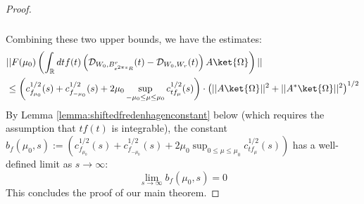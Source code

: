 \documentclass[a4paper,11pt]{article}
\theoremstyle{definition}
\newcommand{\lb}{\left(}
\newcommand{\rb}{\right)}
\begin{document}
\begin{proof}
\begin{align}
\begin{split}
        \end{split}
    \end{align}
    Combining these two upper bounds, we have the estimates:
    \begin{align}
        \begin{split}
            &||F(\mu_0)\lb\int_\mathbb{R} dt f(t)\lb\mathcal{D}_{W_0, B^r_{e^{2\pi s}R}}(t) - \mathcal{D}_{W_0, W_r}(t)\rb A\ket{\Omega}\rb||
            \\&
            \leq \lb c^{1/2}_{f_{\mu_0}}(s) + c^{1/2}_{f_{-\mu_0}}(s) + 2\mu_0\sup_{-\mu_0\leq \mu\leq \mu_0}c^{1/2}_{tf_\mu}(s) \rb\cdot\lb||A\ket{\Omega}||^2 + ||A^*\ket{\Omega}||^2\rb^{1/2}
        \end{split}
    \end{align}
    By Lemma \ref{lemma:shiftedfredenhagenconstant} below (which requires the assumption that $tf(t)$ is integrable), the constant $b_f(\mu_0, s) := \lb c^{1/2}_{f_{\mu_0}}(s) + c^{1/2}_{f_{-\mu_0}}(s) + 2\mu_0\sup_{0\leq \mu\leq \mu_0}c^{1/2}_{tf_\mu}(s)\rb$ has a well-defined limit as $s\rightarrow\infty$:
    \begin{equation}
        \lim_{s\rightarrow\infty}b_f(\mu_0, s) = 0
    \end{equation}
    This concludes the proof of our main theorem. 
\end{proof}
\end{document}
